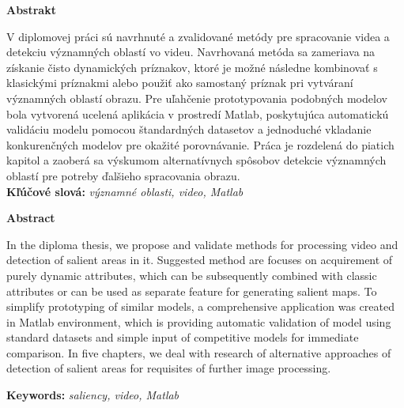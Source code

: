 {\noindent\large\bf Abstrakt}

\vspace{1.8cm}
V diplomovej práci sú navrhnuté a zvalidované metódy pre spracovanie videa a detekciu významných oblastí vo videu.
Navrhovaná metóda sa zameriava na získanie čisto dynamických príznakov, ktoré je možné následne kombinovať s klasickými príznakmi alebo použiť ako samostaný príznak pri vytváraní významných oblastí obrazu.
Pre uľahčenie prototypovania podobných modelov bola vytvorená ucelená aplikácia v prostredí Matlab, poskytujúca automatickú validáciu modelu pomocou štandardných datasetov a jednoduché vkladanie konkurenčných modelov pre okažité porovnávanie.
Práca je rozdelená do piatich kapitol a zaoberá sa výskumom alternatívnych spôsobov detekcie významných oblastí pre potreby ďalšieho spracovania obrazu.
\\

{\parindent0pt \textbf{Kľúčové slová:} \emph{významné oblasti, video, Matlab}}

\newpage
 {\noindent\large\bf Abstract}
  \vspace{1.8cm}


In the diploma thesis, we propose and validate methods for processing video and detection of salient areas in it. Suggested method are focuses on acquirement of purely dynamic attributes, which can be subsequently combined with classic attributes or can be used as separate feature for generating salient maps.
To simplify prototyping of similar models, a comprehensive application was created in Matlab environment, which is providing automatic validation of model using standard datasets and simple input of competitive models for immediate comparison.
In five chapters, we deal with research of alternative approaches of detection of salient areas for requisites of further image processing.

{\parindent0pt \textbf{Keywords:} \emph{saliency, video, Matlab}}


\newpage	
